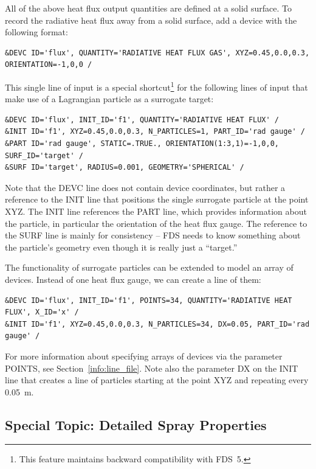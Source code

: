 \documentclass[11pt]{book}
\begin{document}
All of the above heat flux output quantities are defined at a solid surface. To record the radiative heat flux away from a solid surface, add a device with the following format:
\begin{lstlisting}
&DEVC ID='flux', QUANTITY='RADIATIVE HEAT FLUX GAS', XYZ=0.45,0.0,0.3, ORIENTATION=-1,0,0 /
\end{lstlisting}
This single line of input is a special shortcut\footnote{This feature maintains backward compatibility with FDS~5.} for the following lines of input that make use of a Lagrangian particle as a surrogate target:
\begin{lstlisting}
&DEVC ID='flux', INIT_ID='f1', QUANTITY='RADIATIVE HEAT FLUX' /
&INIT ID='f1', XYZ=0.45,0.0,0.3, N_PARTICLES=1, PART_ID='rad gauge' /
&PART ID='rad gauge', STATIC=.TRUE., ORIENTATION(1:3,1)=-1,0,0, SURF_ID='target' /
&SURF ID='target', RADIUS=0.001, GEOMETRY='SPHERICAL' /
\end{lstlisting}
Note that the {\ct DEVC} line does not contain device coordinates, but rather a reference to the {\ct INIT} line that positions the single surrogate particle at the point {\ct XYZ}. The {\ct INIT} line references the {\ct PART} line, which provides information about the particle, in particular the orientation of the heat flux gauge. The reference to the {\ct SURF} line is mainly for consistency -- FDS needs to know something about the particle's geometry even though it is really just a ``target.''

The functionality of surrogate particles can be extended to model an array of devices. Instead of one heat flux gauge, we can create a line of them:
\begin{lstlisting}
&DEVC ID='flux', INIT_ID='f1', POINTS=34, QUANTITY='RADIATIVE HEAT FLUX', X_ID='x' /
&INIT ID='f1', XYZ=0.45,0.0,0.3, N_PARTICLES=34, DX=0.05, PART_ID='rad gauge' /
\end{lstlisting}
For more information about specifying arrays of devices via the parameter {\ct POINTS}, see Section~\ref{info:line_file}. Note also the parameter {\ct DX} on the {\ct INIT} line that creates a line of particles starting at the point {\ct XYZ} and repeating every 0.05~m.













\subsection{Special Topic: Detailed Spray Properties}
\label{PDPA}
\end{document}
